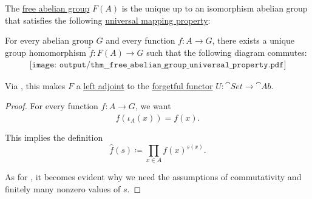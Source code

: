 \begin{proposition}\label{thm:free_abelian_group_universal_property}
  The \hyperref[def:free_abelian_group]{free abelian group} \( F(A) \) is the unique up to an isomorphism abelian group that satisfies the following \hyperref[rem:universal_mapping_property]{universal mapping property}:
  \begin{displayquote}
    For every abelian group \( G \) and every function \( f: A \to G \), there exists a unique group homomorphism \( \widetilde{f}: F(A) \to G \) such that the following diagram commutes:
    \begin{equation}\label{eq:thm:free_abelian_group_universal_property/diagram}
      \begin{aligned}
        \texttt{[image: output/thm\_\_free\_abelian\_group\_universal\_property.pdf]}
      \end{aligned}
    \end{equation}
  \end{displayquote}

  Via , this makes \( F \) a \hyperref[def:category_adjunction]{left adjoint} to the \hyperref[def:concrete_category]{forgetful functor} \( U: \cat{Set} \to \cat{Ab} \).
\end{proposition}
\begin{proof}
  For every function \( f: A \to G \), we want
  \begin{equation*}
    \widehat{f}(\iota_A(x)) = f(x).
  \end{equation*}

  This implies the definition
  \begin{equation*}
    \widehat{f}(s) \coloneqq \prod_{x \in A} {f(x)}^{s(x)}.
  \end{equation*}

  As for , it becomes evident why we need the assumptions of commutativity and finitely many nonzero values of \( s \).
\end{proof}
